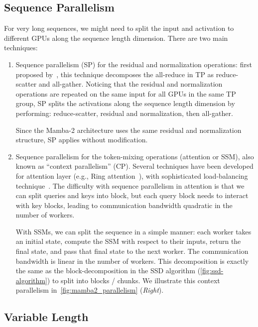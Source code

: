 \subsection{Sequence Parallelism}
\label{subsec:sp}

For very long sequences, we might need to split the input and activation to different GPUs along the sequence length dimension.
There are two main techniques:
\begin{enumerate}
\item Sequence parallelism (SP) for the residual and normalization operations: first proposed by~\citet{korthikanti2023reducing}, this technique decomposes the all-reduce in TP as reduce-scatter and all-gather. Noticing that the residual and normalization operations are repeated on the same input for all GPUs in the same TP group, SP splits the activations along the sequence length dimension by performing: reduce-scatter, residual and normalization, then all-gather.

Since the Mamba-2 architecture uses the same residual and normalization structure, SP applies without modification.

\item Sequence parallelism for the token-mixing operations (attention or SSM), also known as ``context parallelism'' (CP).
Several techniques have been developed for attention layer (e.g., Ring attention~\citep{liu2023ring, liu2024world}), with sophisticated load-balancing technique~\citep{brandon2023striped}.
The difficulty with sequence parallelism in attention is that we can split queries and keys into block, but each query block needs to interact with key blocks, leading to communication bandwidth quadratic in the number of workers.

With SSMs, we can split the sequence in a simple manner: each worker takes an initial state, compute the SSM with respect to their inputs, return the final state, and pass that final state to the next worker.
The communication bandwidth is linear in the number of workers.
This decomposition is exactly the same as the block-decomposition in the SSD algorithm (\cref{fig:ssd-algorithm}) to split into blocks / chunks.
We illustrate this context parallelism in~\cref{fig:mamba2_parallelism} (\emph{Right}).

\end{enumerate}

\subsection{Variable Length}
\label{subsec:varlen}

